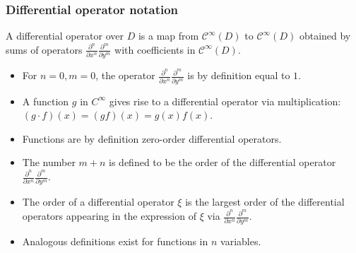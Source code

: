 \begin{frame}
\frametitle{Differential operator notation}
\begin{definition}
A  differential operator over $D$ is a map from $\mathcal C^\infty (D)$ to $\mathcal C^\infty (D)$ obtained by sums of operators $\frac{\partial^n}{ \partial x^n }\frac{\partial^m}{\partial y^m} $ with coefficients in $\mathcal C^\infty (D)$.
\end{definition}
\begin{itemize}
\item<2-> For $n=0,m=0$, the operator $\frac{\partial^n}{ \partial x^n }\frac{\partial^m}{\partial y^m} $ is by definition equal to $1$. 
\item<3-> A function $g$ in $C^{\infty}$ gives rise to a differential operator via multiplication: $(g \cdot f )(x)= (gf)(x)=g(x)f(x)$.
\item<4-> Functions are by definition zero-order differential operators.
\item<5-> The number $m+n$ is defined to be the order of the differential operator $\frac{\partial^n}{ \partial x^n }\frac{\partial^m}{\partial y^m}$.
\item<6-> The order of a differential operator $\xi$ is the largest order of the differential operators appearing in the expression of $\xi$ via $\frac{\partial^n}{ \partial x^n }\frac{\partial^m}{\partial y^m}$.
\item<7-> Analogous definitions exist for functions in $n$ variables.
\end{itemize}
\end{frame}